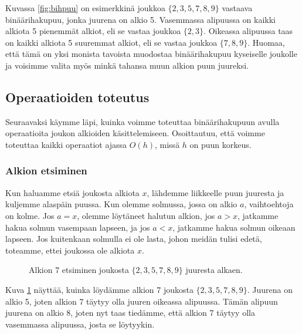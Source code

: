 Kuvassa \ref{fig:bihpuu} on esimerkkinä
joukkoa $\{2,3,5,7,8,9\}$ vastaava binääri\-hakupuu,
jonka juurena on alkio 5.
Vasemmassa alipuussa on kaikki alkiota 5
pienemmät alkiot, eli se vastaa joukkoa $\{2,3\}$.
Oikeassa alipuussa taas on kaikki alkiota 5
suuremmat alkiot, eli se vastaa joukkoa $\{7,8,9\}$.
Huomaa, että tämä on yksi monista tavoista muodostaa
binäärihakupuu kyseiselle joukolle ja voisimme valita myös
minkä tahansa muun alkion puun juureksi.

\subsection{Operaatioiden toteutus}

Seuraavaksi käymme läpi, kuinka voimme toteuttaa
binäärihakupuun avulla operaatioita joukon alkioiden käsittelemiseen.
Osoittautuu, että voimme toteuttaa kaikki
operaatiot ajassa $O(h)$, missä $h$ on puun korkeus.

\subsubsection{Alkion etsiminen}

Kun haluamme etsiä joukosta alkiota $x$, lähdemme liikkeelle
puun juuresta ja kuljemme alaspäin puussa.
Kun olemme solmussa, jossa on alkio $a$,
vaihtoehtoja on kolme.
Jos $a=x$, olemme löytäneet halutun alkion,
jos $a>x$, jatkamme hakua solmun vasempaan lapseen,
ja jos $a<x$, jatkamme hakua solmun oikeaan lapseen.
Jos kuitenkaan solmulla ei ole lasta,
johon meidän tulisi edetä, toteamme,
ettei joukossa ole alkiota $x$.

\begin{figure}
\center
{}
\caption{Alkion $7$ etsiminen joukosta $\{2,3,5,7,8,9\}$ juuresta alkaen.}
\label{fig:bihets}
\end{figure}

Kuva \ref{fig:bihets} näyttää, kuinka löydämme alkion 7
joukosta $\{2,3,5,7,8,9\}$.
Juurena on alkio 5, joten alkion 7 täytyy olla juuren
oikeassa alipuussa.
Tämän alipuun juurena on alkio 8,
joten nyt taas tiedämme, että alkion 7 täytyy olla
vasemmassa alipuussa, josta se löytyykin.

